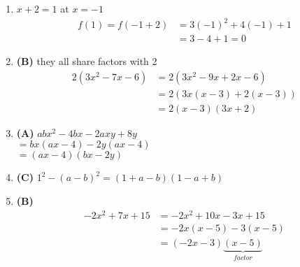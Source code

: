 \begin{multicols}{2}
\begin{enumerate}[label={\textbf{\arabic*.}}]
\item $x+2 = 1$ at $x = -1$
\begin{align*}
f(1) = f(-1 + 2) &= 3(-1)^2 + 4(-1) + 1 \\
& = 3 - 4 + 1 = 0
\end{align*}

\item \textbf{(B)} they all share factors with 2
\begin{align*}
2(3x^2 - 7x - 6) & = 2(3x^2 - 9x + 2x -6) \\
& = 2\left(3x(x - 3) + 2(x - 3)\right) \\
& = 2(x-3)(3x +2)
\end{align*}

\item \textbf{(A)} $abx^2 -4bx -2axy + 8y$  \\
$= bx(ax - 4) - 2y(ax - 4)$ \\
$=(ax -4)(bx-2y)$

\item \textbf{(C)} $1^2 - (a -b)^2 = (1 +a -b)(1 -a + b)$

\item\textbf{(B)}
\begin{align*}
-2x^2 + 7x + 15 &= -2x^2 + 10x - 3x + 15 \\
& = -2x(x -5) -3(x-5) \\
& = (-2x -3)\underbrace{(x-5)}_{factor}
\end{align*}


\end{enumerate}
\end{multicols}
